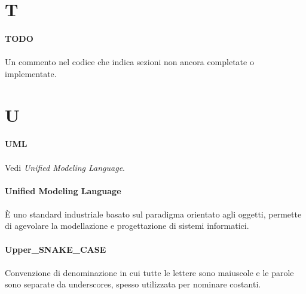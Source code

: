 \documentclass[10pt, a4paper]{article}
\begin{document}
\newpage
\section{T}
\vspace{2em}
\paragraph{TODO}\noindent\hrulefill
\paragraph{}Un commento nel codice che indica sezioni non ancora completate o implementate.


\newpage
\section{U}

\vspace{2em}
\paragraph{UML}\noindent\hrulefill 
\paragraph{}Vedi \textit{Unified Modeling Language\pg}.

\vspace{2em}
\paragraph{Unified Modeling Language}\noindent\hrulefill
\paragraph{}È uno standard industriale basato sul paradigma orientato agli oggetti, permette di agevolare la modellazione e progettazione di sistemi informatici.

\vspace{2em}
\paragraph{Upper\_SNAKE\_CASE}\noindent\hrulefill
\paragraph{}Convenzione di denominazione in cui tutte le lettere sono maiuscole e le parole sono separate da underscores, spesso utilizzata per nominare costanti.
\end{document}
